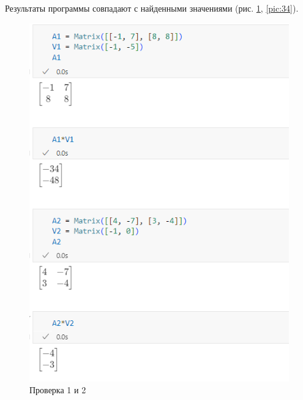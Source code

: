 \documentclass[14pt,a4paper]{extarticle}
\begin{document}
Результаты программы совпадают с найденными значениями (рис. \ref{pic:12}, \ref{pic:34}).
\begin{figure}[h!]
    \centering
    \includegraphics[scale=0.7]{pic8/2.1.png}
    \caption{Проверка 1 и 2}
    \label{pic:12}
\end{figure}
\FloatBarrier
\end{document}
